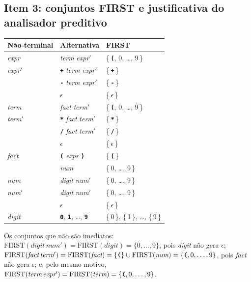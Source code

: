 \documentclass[11pt,a4paper]{article}
\newcommand{\nt}[1]{\textit{#1}}                 %
\newcommand{\tm}[1]{\texttt{\textbf{#1}}}        %
\newcommand{\vazio}{\ensuremath{\epsilon}}
\newcommand{\linha}{\ensuremath{'}}
\begin{document}
	\subsection{Item 3: conjuntos FIRST e justificativa do analisador preditivo}
	
	\begin{center}
		\begin{tabular}{lll}
			\toprule
			Não-terminal & Alternativa & FIRST \\
			\midrule
			\nt{expr}        & \nt{term} \nt{expr}\linha                 & \{\,\tm{(}, 0, \dots, 9\,\} \\ \addlinespace[2pt]
			\nt{expr}\linha  & \tm{+} \nt{term} \nt{expr}\linha          & \{\,\tm{+}\,\} \\
			& \tm{-} \nt{term} \nt{expr}\linha          & \{\,\tm{-}\,\} \\
			& \vazio                                    & \{\,\vazio\,\} \\ \addlinespace[2pt]
			\nt{term}        & \nt{fact} \nt{term}\linha                 & \{\,\tm{(}, 0, \dots, 9\,\} \\ \addlinespace[2pt]
			\nt{term}\linha  & \tm{*} \nt{fact} \nt{term}\linha          & \{\,\tm{*}\,\} \\
			& \tm{/} \nt{fact} \nt{term}\linha          & \{\,\tm{/}\,\} \\
			& \vazio                                    & \{\,\vazio\,\} \\ \addlinespace[2pt]
			\nt{fact}        & \tm{(} \nt{expr} \tm{)}                   & \{\,\tm{(}\,\} \\
			& \nt{num}                                  & \{\,0, \dots, 9\,\} \\ \addlinespace[2pt]
			\nt{num}         & \nt{digit} \nt{num}\linha                 & \{\,0, \dots, 9\,\} \\ \addlinespace[2pt]
			\nt{num}\linha   & \nt{digit} \nt{num}\linha                 & \{\,0, \dots, 9\,\} \\
			& \vazio                                    & \{\,\vazio\,\} \\ \addlinespace[2pt]
			\nt{digit}       & \tm{0}, \tm{1}, \dots, \tm{9}             & \{\,0\,\}, \{\,1\,\}, \dots, \{\,9\,\} \\
			\bottomrule
		\end{tabular}
	\end{center}
	
	Os conjuntos que não são imediatos: $\text{FIRST}(\nt{digit}\,\nt{num}\linha) = \text{FIRST}(\nt{digit}) = \{0,\dots,9\}$, pois \nt{digit} não gera \vazio; $\text{FIRST}(\nt{fact}\,\nt{term}\linha) = \text{FIRST}(\nt{fact}) = \{\tm{(}\} \cup \text{FIRST}(\nt{num}) = \{\tm{(},0,\dots,9\}$, pois \nt{fact} não gera \vazio; e, pelo mesmo motivo, $\text{FIRST}(\nt{term}\,\nt{expr}\linha) = \text{FIRST}(\nt{term}) = \{\tm{(},0,\dots,9\}$.
	
\end{document}
